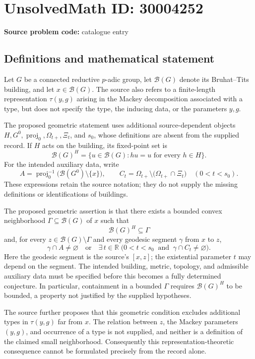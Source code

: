 \documentclass[11pt]{article}
\begin{document}
\section*{UnsolvedMath ID: 30004252}
\textbf{Source problem code:} catalogue entry
\subsection{Definitions and mathematical statement}
Let \(G\) be a connected reductive \(p\)-adic group, let \(\mathcal B(G)\) denote its Bruhat--Tits building, and let \(x\in\mathcal B(G)\). The source also refers to a finite-length representation \(\tau(y,g)\) arising in the Mackey decomposition associated with a type, but does not specify the type, the inducing data, or the parameters \(y,g\).

The proposed geometric statement uses additional source-dependent objects \(H,G^0,\operatorname{proj}_0,\Omega_{t+},\Xi_t\), and \(s_0\), whose definitions are absent from the supplied record. If \(H\) acts on the building, its fixed-point set is
\[
\mathcal B(G)^H=\{u\in\mathcal B(G):hu=u\text{ for every }h\in H\}.
\]
For the intended auxiliary data, write
\[
A=\operatorname{proj}_0^{-1}\bigl(\mathcal B(G^0)\setminus\{x\}\bigr),\qquad
C_t=\Omega_{t+}\setminus\bigl(\Omega_{t+}\cap\Xi_t\bigr)
\quad(0<t<s_0).
\]
These expressions retain the source notation; they do not supply the missing definitions or identifications of buildings.

The proposed geometric assertion is that there exists a bounded convex neighborhood \(\Gamma\subseteq\mathcal B(G)\) of \(x\) such that
\[
\mathcal B(G)^H\subseteq\Gamma
\]
and, for every \(z\in\mathcal B(G)\setminus\Gamma\) and every geodesic segment \(\gamma\) from \(x\) to \(z\),
\[
\gamma\cap A\ne\varnothing
\quad\text{or}\quad
\exists\,t\in\mathbb R\;\bigl(0<t<s_0\ \text{ and }\ \gamma\cap C_t\ne\varnothing\bigr).
\]
Here the geodesic segment is the source's \([x,z]\); the existential parameter \(t\) may depend on the segment. The intended building, metric, topology, and admissible auxiliary data must be specified before this becomes a fully determined conjecture. In particular, containment in a bounded \(\Gamma\) requires \(\mathcal B(G)^H\) to be bounded, a property not justified by the supplied hypotheses.

The source further proposes that this geometric condition excludes additional types in \(\tau(y,g)\) far from \(x\). The relation between \(z\), the Mackey parameters \((y,g)\), and occurrence of a type is not supplied, and neither is a definition of the claimed small neighborhood. Consequently this representation-theoretic consequence cannot be formulated precisely from the record alone.
\end{document}
